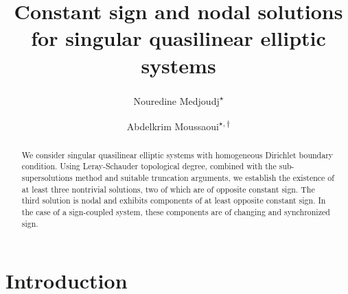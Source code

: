 \documentclass[11pt]{amsart}
\theoremstyle{definition}
\theoremstyle{remark}
\numberwithin{equation}{section}
\begin{document}
\title[Multiple solutions for singular quasilinear elliptic systems]{%
Constant sign and nodal solutions for singular quasilinear elliptic systems}

\begin{abstract}
We consider singular quasilinear elliptic systems with homogeneous Dirichlet
boundary condition. Using Leray-Schauder topological degree, combined with
the sub-supersolutions method and suitable truncation arguments, we
establish the existence of at least three nontrivial solutions, two of which
are of opposite constant sign. The third solution is nodal and exhibits
components of at least opposite constant sign. In the case of a sign-coupled
system, these components are of changing and synchronized sign.
\end{abstract}

\author{Nouredine Medjoudj\textsuperscript{$\star$}}
\address{\textsuperscript{$\star$} Applied Mathematics Laboratory, Faculty
of Exact Sciences,\\
A. Mira Bejaia University, Targa Ouzemour, 06000 Bejaia, Algeria}
\author{Abdelkrim Moussaoui\textsuperscript{$\star, \dagger$}}
\address{$\dagger$ Department of Physico-Chemical Biology, Faculty of
Natural and Life Sciences,\\
A. Mira Bejaia University, Algeria}
\maketitle

\section{Introduction}

\label{S1}
\end{document}
